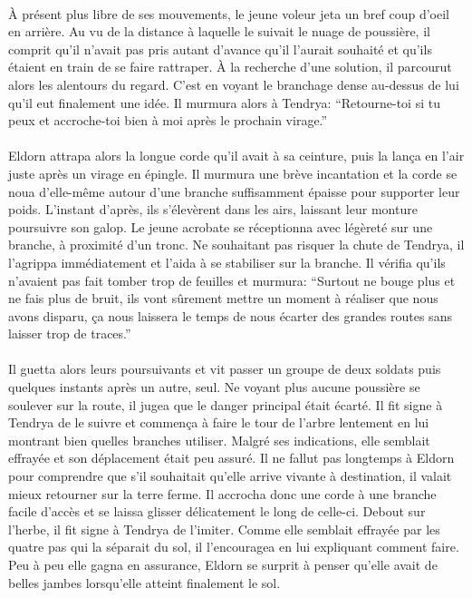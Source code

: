 \paragraph{}
À présent plus libre de ses mouvements, le jeune voleur jeta un bref coup
d'oeil en arrière. Au vu de la distance à laquelle le suivait le nuage de
poussière, il comprit qu'il n'avait pas pris autant d'avance qu'il l'aurait
souhaité et qu'ils étaient en train de se faire rattraper. À la recherche
d'une solution, il parcourut alors les alentours du regard. C'est en voyant
le branchage dense au-dessus de lui qu'il eut finalement une idée. Il murmura
alors à Tendrya: ``Retourne-toi si tu peux et accroche-toi bien à moi après
le prochain virage.''

\paragraph{}%
Eldorn attrapa alors la longue corde qu'il avait à sa ceinture, puis la lança
en l'air juste après un virage en épingle. Il murmura une brève incantation
et la corde se noua d'elle-même autour d'une branche suffisamment épaisse
pour supporter leur poids. L'instant d'après, ils s'élevèrent dans les airs,
laissant leur monture poursuivre son galop. Le jeune acrobate se réceptionna
avec légèreté sur une branche, à proximité d'un tronc. Ne souhaitant pas
risquer la chute de Tendrya, il l'agrippa immédiatement et l'aida à se
stabiliser sur la branche. Il vérifia qu'ils n'avaient pas fait tomber trop
de feuilles et murmura: ``Surtout ne bouge plus et ne fais plus de bruit,
ils vont sûrement mettre un moment à réaliser que nous avons disparu, ça
nous laissera le temps de nous écarter des grandes routes sans laisser trop
de traces.''

\paragraph{}
Il guetta alors leurs poursuivants et vit passer un groupe de deux soldats
puis quelques instants après un autre, seul. Ne voyant plus aucune poussière
se soulever sur la route, il jugea que le danger principal était écarté. Il
fit signe à Tendrya de le suivre et commença à faire le tour de l'arbre
lentement en lui montrant bien quelles branches utiliser. Malgré ses
indications, elle semblait effrayée et son déplacement était peu assuré. Il
ne fallut pas longtemps à Eldorn pour comprendre que s'il souhaitait qu'elle
arrive vivante à destination, il valait mieux retourner sur la terre ferme.
Il accrocha donc une corde à une branche facile d'accès et se laissa glisser
délicatement le long de celle-ci. Debout sur l'herbe, il fit signe à Tendrya
de l'imiter. Comme elle semblait effrayée par les quatre pas qui la séparait
du sol, il l'encouragea en lui expliquant comment faire. Peu à peu elle
gagna en assurance, Eldorn se surprit à penser qu'elle avait de belles jambes
lorsqu'elle atteint finalement le sol.

